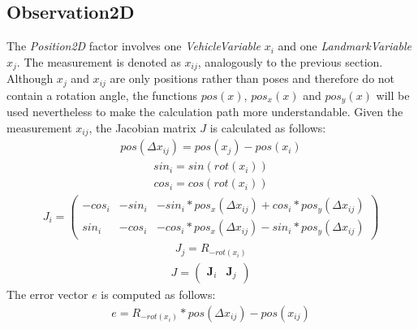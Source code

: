 \subsection{Observation2D}
The \textit{Position2D} factor involves one \textit{VehicleVariable} $x_i$ and one \textit{LandmarkVariable} $x_j$. The measurement is denoted as $x_{ij}$, analogously to the previous section. Although $x_j$ and $x_{ij}$ are only positions rather than poses and therefore do not contain a rotation angle, the functions $pos(x)$, $pos_x(x)$ and $pos_y(x)$ will be used nevertheless to make the calculation path more understandable. Given the measurement $x_{ij}$, the Jacobian matrix $J$ is calculated as follows:
\begin{align}
	pos(\Delta x_{ij}) = pos(x_j) - pos(x_i)
\end{align}
\begin{align}
	sin_i = sin(rot(x_i))
\end{align}
\begin{align}
	cos_i = cos(rot(x_i))
\end{align}
\begin{align}
	J_i =
	\begin{pmatrix}
		-cos_i & -sin_i & -sin_i*pos_x(\Delta x_{ij}) + cos_i*pos_y(\Delta x_{ij})\\
		 sin_i & -cos_i & -cos_i*pos_x(\Delta x_{ij}) - sin_i*pos_y(\Delta x_{ij})
	\end{pmatrix}
\end{align}
\begin{align}
	J_j = R_{-rot(x_i)}
\end{align}
\begin{align}
	J =
	\begin{pmatrix}
		\boldsymbol{J}_i & \boldsymbol{J}_j
	\end{pmatrix}
\end{align}
The error vector $e$ is computed as follows:
\begin{align}
	e = R_{-rot(x_i)} * pos(\Delta x_{ij}) - pos(x_{ij})
\end{align}
